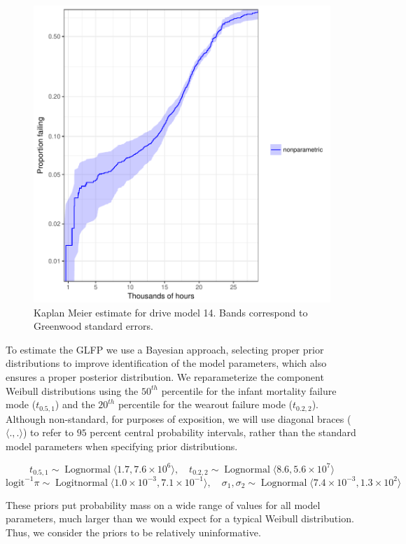 \documentclass[12pt]{article}
\newcommand{\op}{\operatorname}
\begin{document}
\begin{figure}[H]
\centering
  \includegraphics[width=.8\textwidth]{mod14km.pdf}
  \caption{Kaplan Meier estimate for drive model 14.  Bands correspond to Greenwood standard errors.}
  \label{fig1}
\end{figure}


To estimate the GLFP we use a Bayesian approach, selecting proper prior distributions to improve identification of the model parameters, which also ensures a proper posterior distribution. We reparameterize the component Weibull distributions using the $50^{th}$ percentile for the infant mortality failure mode ($t_{0.5,1}$) and the $20^{th}$ percentile for the wearout failure mode ($t_{0.2,2}$). Although non-standard, for purposes of exposition, we will use diagonal braces ($\langle.,.\rangle$) to refer to $95$ percent central probability intervals, rather than the standard model parameters when specifying prior distributions.

$$t_{0.5,1} \sim \op{Lognormal} \langle 1.7,7.6\times 10^6 \rangle,\quad
t_{0.2,2} \sim \op{Lognormal}\langle 8.6, 5.6\times 10^7 \rangle$$
$$\mbox{logit}^{-1}\pi \sim \op{Logitnormal}\langle 1.0\times 10^{-3}, 7.1\times 10^{-1} \rangle,\quad
\sigma_1, \sigma_2 \sim \op{Lognormal}\langle 7.4 \times 10 ^{-3} ,1.3 \times 10^2 \rangle $$

These priors put probability mass on a wide range of values for all model parameters, much larger than we would expect for a typical Weibull distribution.  Thus, we consider the priors to be relatively uninformative. 
\end{document}
